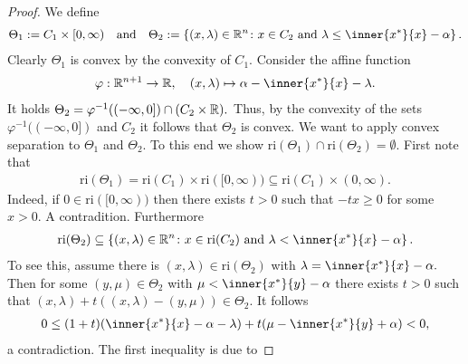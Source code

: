\begin{proof}
  \emph{\cite[Theorem~4.23]{Mordukhovich2022}}
  We define
  \begin{gather}
    \Theta_1
    :=
    C_1 \times [0,\infty)
    \quad
    \text{and}
    \quad
    \Theta_2
    :=
    \left\{ 
      (x,\lambda)\in \R^n
      \colon
      x \in C_2
      \ 
      \text{and}
      \ 
      \lambda
      \le
      \inner{x^*}{x} - \alpha
    \right\}.
  \end{gather}
  Clearly $\Theta_1$ is convex by the convexity of $C_1.$
  Consider the affine function
  \begin{gather}
    \varphi:
    \R^{n+1} \to \R
    ,
    \quad
    (x,\lambda)
    \mapsto
    \alpha - \inner{x^*}{x} - \lambda.
  \end{gather}
  It holds 
  $
    \Theta_2
    =
    \varphi^{-1}((-\infty,0])
    \cap
    (
      C_2\times \mathbb{R}
    )
    .
  $
  Thus, by the convexity of the sets
  $
    \varphi^{-1}((-\infty,0])
  $
  and $C_2$
  it follows that $\Theta_2$ is convex.
  We want to apply convex separation to 
  $\Theta_1$ and $\Theta_2$.
  To this end we show 
  $\mathrm{ri}(\Theta_1)\cap\mathrm{ri}(\Theta_2)=\emptyset.$
  First note that
  \begin{gather}
    \mathrm{ri}(\Theta_1)
    =
    \mathrm{ri}(C_1)
    \times
    \mathrm{ri}([0,\infty))
    \subseteq
    \mathrm{ri}(C_1)
    \times
    (0,\infty).
  \end{gather}
  Indeed, if 
  $
    0\in
    \mathrm{ri}([0,\infty))
  $
  then there exists $t>0$ such that $-tx\ge 0$ for some $x>0.$ A contradition.
  Furthermore
\begin{gather}
  \mathrm{ri}(\Theta_2)
  \subseteq
    \left\{ 
      (x,\lambda)\in \R^n
      \colon
      x \in \mathrm{ri}(C_2) 
      \ 
      \text{and}
      \ 
      \lambda
      <
      \inner{x^*}{x} - \alpha
    \right\}.
\end{gather}
To see this, assume there is 
$
(x,\lambda)
\in \mathrm{ri}(\Theta_2)
$
with
$
      \lambda
      =
      \inner{x^*}{x} - \alpha
      .
$
Then for some 
$
  (y,\mu)
  \in \Theta_2
$
with
$
      \mu    
      <
      \inner{x^*}{y} - \alpha
$
there exists $t>0$ such that 
$
  (x,\lambda)
  +
  t
  (
  (x,\lambda)
  -
  (y,\mu)
  )
  \in \Theta_2.
$
It follows
\begin{align}
  0
  \le
  (1+t)(\inner{x^*}{x}-\alpha -\lambda)
  +
  t
  (
    \mu 
    -\inner{x^*}{y}
    +
    \alpha
  )
  <0
,
\end{align}
a contradiction.
The first inequality is due to 

\end{proof}
